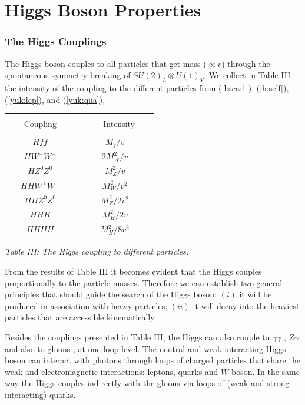 \documentclass[12pt]{report}
\begin{document}
\section{Higgs Boson Properties} 


\subsubsection{The Higgs Couplings} \indent

The Higgs boson couples to all particles that get mass ($\propto v$)
through the spontaneous symmetry breaking of $SU(2)_L \otimes
U(1)_Y$. We collect in Table III the intensity of the coupling to
the different particles from (\ref{l:sca:1}),
(\ref{h:self}), (\ref{yuk:lep}), and (\ref{yuk:qua}), 
\begin{center}
\begin{tabular}{cc}
\hline\hline 
&\\[-0.2cm]
~~~ Coupling ~~~  & ~~~~~ Intensity ~~~ \\[0.2cm]
\hline 
&\\[-0.2cm]
$H f \bar{f}$  	&   $M_f/v$ 	\\
$H W^+ W^-$ 	&   $2 M_W^2/v$ \\
$H Z^0 Z^0$	&   $M_Z^2/v$ 	\\
$H H W^+ W^-$ 	&   $M_W^2/v^2$ \\
$H H  Z^0 Z^0$ 	&   $M_Z^2/2v^2$\\
$H H H$ 	&   $M_H^2/2v$ 	\\
$H H H H$  	&   $M_H^2/8v^2$\\[0.2cm]
\hline\hline 
\end{tabular}
\end{center}
\centerline{\it Table III: The Higgs coupling to different particles.}

\vskip 0.5cm
From the results of Table III it becomes evident that the Higgs
couples proportionally to the particle masses. Therefore we can
establish two general principles that should guide the search of the
Higgs boson: $(i)$ it will be produced in association with heavy
particles; $(ii)$ it will decay into the heaviest particles that
are accessible kinematically.

Besides the couplings presented in Table III, the Higgs can also
couple to $\gamma\gamma$ \cite{Ellis:76}, $Z\gamma$
\cite{Cahn:79,Barroso:86} and also to gluons
\cite{Georgi:78,Novaes:83}, at one loop level. The neutral and weak
interacting Higgs boson can interact with photons through loops of
charged particles that share the weak and electromagnetic
interactions: leptons, quarks and $W$ boson. In the same way the
Higgs couples indirectly with the gluons via loops of  (weak and
strong interacting) quarks. 
\end{document}
